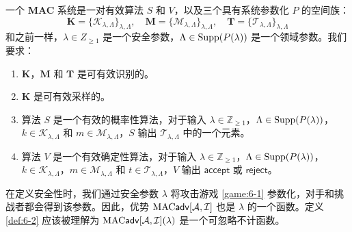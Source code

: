 \begin{definition}[MAC]\label{def:6-3}
一个 \textbf{MAC} 系统是一对有效算法 $S$ 和 $V$，以及三个具有系统参数化 $P$ 的空间族：
\[
\mathbf{K}=\{\mathcal{K}_{\lambda,\Lambda}\}_{\lambda,\Lambda},\quad
\mathbf{M}=\{\mathcal{M}_{\lambda,\Lambda}\}_{\lambda,\Lambda},\quad
\mathbf{T}=\{\mathcal{T}_{\lambda,\Lambda}\}_{\lambda,\Lambda}
\]
和之前一样，$\lambda\in Z_{\geq1}$ 是一个安全参数，$\Lambda\in{\rm Supp}(P(\lambda))$ 是一个领域参数。我们要求：
\begin{enumerate}
	\item $\mathbf{K}$，$\mathbf{M}$ 和 $\mathbf{T}$ 是可有效识别的。
	\item $\mathbf{K}$ 是可有效采样的。
	\item 算法 $S$ 是一个有效的概率性算法，对于输入 $\lambda\in\mathbb{Z}_{\geq1}$，$\Lambda\in{\rm Supp}(P(\lambda))$，$k\in\mathcal{K}_{\lambda,\Lambda}$ 和 $m\in\mathcal{M}_{\lambda,\Lambda}$，$S$ 输出 $\mathcal{T}_{\lambda,\Lambda}$ 中的一个元素。
	\item 算法 $V$ 是一个有效确定性算法，对于输入 $\lambda\in\mathbb{Z}_{\geq1}$，$\Lambda\in{\rm Supp}(P(\lambda))$，$k\in\mathcal{K}_{\lambda,\Lambda}$，$m\in\mathcal{M}_{\lambda,\Lambda}$ 和 $t\in\mathcal{T}_{\lambda,\Lambda}$，$V$ 输出 $\mathsf{accept}$ 或 $\mathsf{reject}$。
\end{enumerate}

\end{definition}

在定义安全性时，我们通过安全参数 $\lambda$ 将攻击游戏 \ref{game:6-1} 参数化，对手和挑战者都会得到该参数。因此，优势 ${\rm MAC}\mathsf{adv}[\mathcal{A},\mathcal{I}]$ 也是 $\lambda$ 的一个函数。定义 \ref{def:6-2} 应该被理解为 ${\rm MAC}\mathsf{adv}[\mathcal{A},\mathcal{I}](\lambda)$ 是一个可忽略不计函数。
